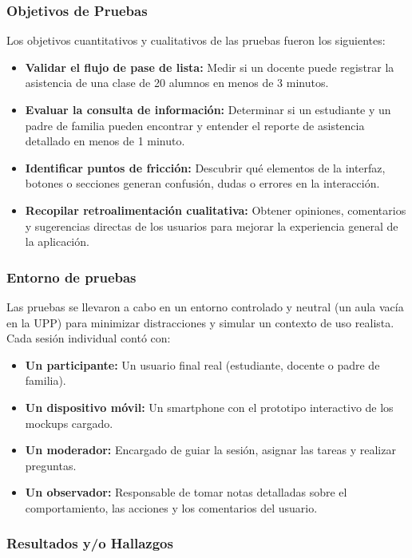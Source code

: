 \subsubsection{Objetivos de Pruebas}
Los objetivos cuantitativos y cualitativos de las pruebas fueron los siguientes:
\begin{itemize}
	\item \textbf{Validar el flujo de pase de lista:} Medir si un docente puede registrar la asistencia de una clase de 20 alumnos en menos de 3 minutos.
	\item \textbf{Evaluar la consulta de información:} Determinar si un estudiante y un padre de familia pueden encontrar y entender el reporte de asistencia detallado en menos de 1 minuto.
	\item \textbf{Identificar puntos de fricción:} Descubrir qué elementos de la interfaz, botones o secciones generan confusión, dudas o errores en la interacción.
	\item \textbf{Recopilar retroalimentación cualitativa:} Obtener opiniones, comentarios y sugerencias directas de los usuarios para mejorar la experiencia general de la aplicación.
\end{itemize}

\clearpage
\subsubsection{Entorno de pruebas}
Las pruebas se llevaron a cabo en un entorno controlado y neutral (un aula vacía en la UPP) para minimizar distracciones y simular un contexto de uso realista. Cada sesión individual contó con:
\begin{itemize}
	\item \textbf{Un participante:} Un usuario final real (estudiante, docente o padre de familia).
	\item \textbf{Un dispositivo móvil:} Un smartphone con el prototipo interactivo de los mockups cargado.
	\item \textbf{Un moderador:} Encargado de guiar la sesión, asignar las tareas y realizar preguntas.
	\item \textbf{Un observador:} Responsable de tomar notas detalladas sobre el comportamiento, las acciones y los comentarios del usuario.
\end{itemize}

\subsubsection{Resultados y/o Hallazgos}

